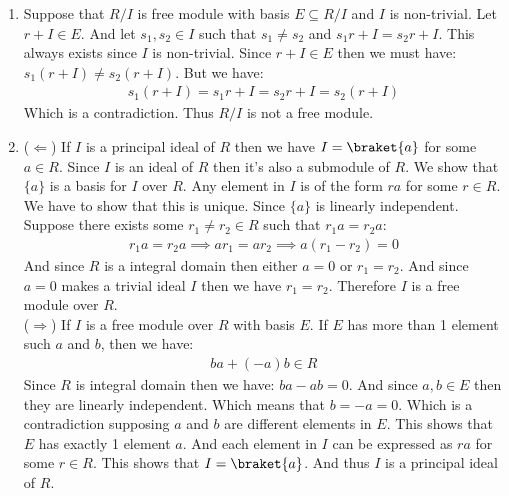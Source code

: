 \begin{enumerate}[label=\ilabel]
    \item 
        Suppose that $R/I$ is free module with basis $E \subseteq R/I$ and $I$ is non-trivial. Let $r + I \in E$. And let $s_1, s_2 \in I$ such that $s_1 \ne s_2$ and $s_1 r + I = s_2 r + I$. This always exists since $I$ is non-trivial. Since $r + I \in E$ then we must have: $s_1 (r + I) \ne s_2(r + I)$.
        But we have:
        \begin{gather*}
            s_1(r + I) = s_1 r + I = s_2 r + I = s_2 (r + I)
        \end{gather*}
        Which is a contradiction. Thus $R/I$ is not a free module.
    \item
        ($\Leftarrow$) If $I$ is a principal ideal of $R$ then we have $I = \braket{a}$ for some $a \in R$. Since $I$ is an ideal of $R$ then it's also a submodule of $R$. We show that $\{a\}$ is a basis for $I$ over $R$. Any element in $I$ is of the form $ra$ for some $r \in R$. We have to show that this is unique. Since $\{a\}$ is linearly independent. Suppose there exists some $r_1 \ne r_2 \in R$ such that $r_1 a = r_2 a$:
        \begin{gather*}
            r_1 a = r_2 a \implies ar_1 = ar_2  \implies a(r_1 - r_2) = 0
        \end{gather*}
        And since $R$ is a integral domain then either $a = 0$ or $r_1 = r_2$. And since $a = 0$ makes a trivial ideal $I$ then we have $r_1 = r_2$. Therefore $I$ is a free module over $R$. \\
        ($\Rightarrow$) If $I$ is a free module over $R$ with basis $E$. If $E$ has more than 1 element such $a$ and $b$, then we have:
        \begin{gather*}
            ba + (-a) b \in R
        \end{gather*}
        Since $R$ is integral domain then we have: $ba - ab = 0$. And since $a, b \in E$ then they are linearly independent. Which means that $b = -a = 0$. Which is a contradiction supposing $a$ and $b$ are different elements in $E$. This shows that $E$ has exactly 1 element $a$. And each element in $I$ can be expressed as $ra$ for some $r \in R$. This shows that $I = \braket{a}$. And thus $I$ is a principal ideal of $R$.
\end{enumerate}